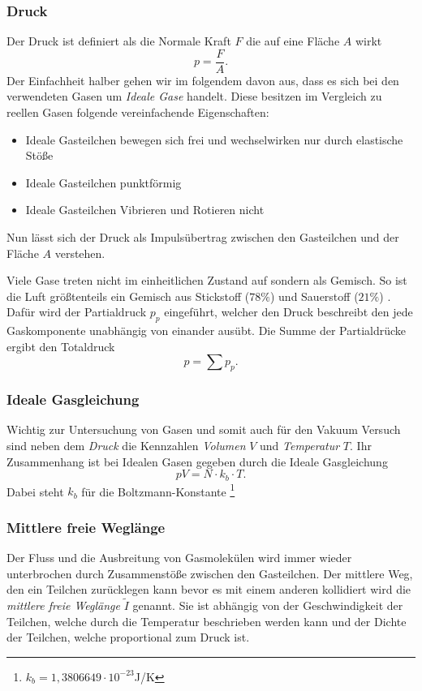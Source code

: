 \subsubsection*{Druck}
Der Druck ist definiert als die Normale Kraft $F$ die auf eine Fläche $A$ wirkt
\begin{equation}
    p = \frac{F}{A}. \label{eq:Druck}
\end{equation}
Der Einfachheit halber gehen wir im folgendem davon aus, 
dass es sich bei den verwendeten Gasen um \textit{Ideale Gase} handelt.
Diese besitzen im Vergleich zu reellen Gasen folgende vereinfachende Eigenschaften:
\begin{itemize}
    \item Ideale Gasteilchen bewegen sich frei und wechselwirken nur durch elastische Stöße
    \item Ideale Gasteilchen punktförmig
    \item Ideale Gasteilchen Vibrieren und Rotieren nicht 
\end{itemize}
Nun lässt sich der Druck als Impulsübertrag zwischen den Gasteilchen und der Fläche $A$ verstehen.  

Viele Gase treten nicht im einheitlichen Zustand auf sondern als Gemisch.
So ist die Luft größtenteils ein Gemisch aus Stickstoff ($78\%$) und Sauerstoff ($21\%$) \cite{luft}. 
Dafür wird der Partialdruck $p_p$ eingeführt, 
welcher den Druck beschreibt den jede Gaskomponente unabhängig von einander ausübt.
Die Summe der Partialdrücke ergibt den Totaldruck
\begin{equation}
    p = \sum p_p.
\end{equation}

\subsubsection*{Ideale Gasgleichung}
Wichtig zur Untersuchung von Gasen 
und somit auch für den Vakuum Versuch sind neben dem \textit{Druck} die Kennzahlen \textit{Volumen} $V$
und \textit{Temperatur} $T$.
Ihr Zusammenhang ist bei Idealen Gasen gegeben durch die Ideale Gasgleichung
\begin{equation}
    pV=N\cdot k_b\cdot T. \label{eq:idealgaß}
\end{equation}
Dabei steht $k_b$ für die Boltzmann-Konstante \footnote{$k_b = 1,3806649\cdot10^{-23}$J/K}

\subsubsection*{Mittlere freie Weglänge}
Der Fluss und die Ausbreitung von Gasmolekülen wird immer wieder unterbrochen durch Zusammenstöße zwischen den Gasteilchen.
Der mittlere Weg, 
den ein Teilchen zurücklegen kann bevor es mit einem anderen kollidiert wird die \textit{mittlere freie Weglänge} $\tilde{I}$ genannt.
Sie ist abhängig von der Geschwindigkeit der Teilchen, welche durch die Temperatur beschrieben werden kann 
und der Dichte der Teilchen, welche proportional zum Druck ist.  

